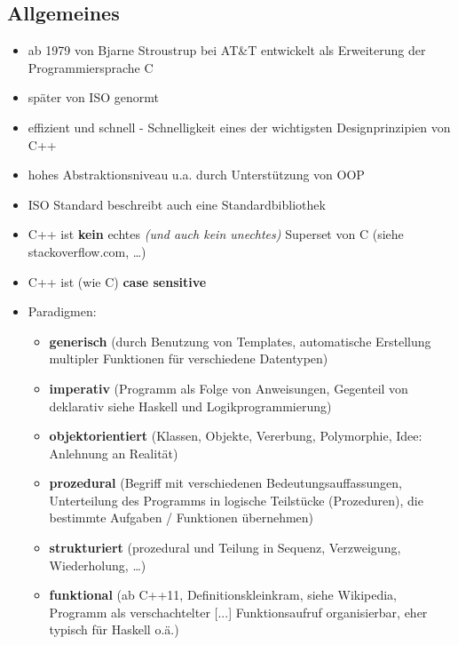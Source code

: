 \documentclass[a4paper]{report}
\begin{document}
\subsection{Allgemeines}
\begin{itemize}
\item ab 1979 von Bjarne Stroustrup bei AT\&T entwickelt als Erweiterung der Programmiersprache C
\item später von ISO genormt
\vspace{2ex}
\item effizient und schnell - Schnelligkeit eines der wichtigsten Designprinzipien von C++
\item hohes Abstraktionsniveau u.a. durch Unterstützung von OOP
\item ISO Standard beschreibt auch eine Standardbibliothek
\item C++ ist \textbf{kein} echtes \textit{(und auch kein unechtes)} Superset von C (siehe stackoverflow.com, \dots)
\item C++ ist (wie C) \textbf{case sensitive}
\vspace{2ex}

\item Paradigmen:
	\begin{itemize}
		\item \textbf{generisch} (durch Benutzung von Templates, automatische Erstellung multipler Funktionen für verschiedene Datentypen)
		\item \textbf{imperativ} (Programm als Folge von Anweisungen, Gegenteil von deklarativ siehe Haskell und Logikprogrammierung)
		\item \textbf{objektorientiert} (Klassen, Objekte, Vererbung, Polymorphie, Idee: Anlehnung an Realität)
		\item \textbf{prozedural} (Begriff mit verschiedenen Bedeutungsauffassungen, Unterteilung des Programms in logische Teilstücke (Prozeduren), die bestimmte Aufgaben / Funktionen übernehmen)
		\item \textbf{strukturiert} (prozedural und Teilung in Sequenz, Verzweigung, Wiederholung, \dots )
		\item \textbf{funktional} (ab C++11, Definitionskleinkram, siehe Wikipedia, Programm als verschachtelter [...] Funktionsaufruf 	organisierbar, eher typisch für Haskell o.ä.)
	\end{itemize}
\end{itemize}
\end{document}
